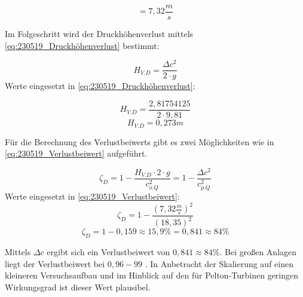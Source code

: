 $$ =7,32 \frac{m}{s}$$

Im Folgeschritt wird der Druckhöhenverlust mittels \autoref{eq:230519_Druckhöhenverlust} bestimmt:

\begin{equation}
H_{V.D} = \frac{\Delta c^2}{2\cdot g}
\label{eq:230519_Druckhöhenverlust}
\end{equation}
Werte eingesetzt in \autoref{eq:230519_Druckhöhenverlust}:

$$ H_{V.D} = \frac{2,81754125}{2\cdot 9,81} $$
$$ H_{V.D} = 0,273m $$

Für die Berechnung des Verlustbeiwerts gibt es zwei Möglichkeiten wie in \autoref{eq:230519_Verlustbeiwert} aufgeführt.

\begin{equation}
\zeta_D =1 - \frac{H_{V.D} \cdot 2 \cdot g}{c_{o.Q}^2}= 1 - \frac{\Delta c^2}{c_{p.Q}^2}
\label{eq:230519_Verlustbeiwert}
\end{equation}
Werte eingesetzt in \autoref{eq:230519_Verlustbeiwert}:
$$\zeta_{D} = 1 - \frac{(7,32\frac{m}{s})^2}{(18,35)^2}$$
$$ \zeta_{D} = 1 - 0,159 \approx 15,9\% = 0,841 \approx 84\% $$

Mittels $\Delta c$ ergibt sich ein Verlustbeiwert von $0,841 \approx 84\%$.
Bei großen Anlagen liegt der Verlustbeiwert bei $0,96-99$ \cite[S.32]{TUMUC}. 
In Anbetracht der Skalierung auf einen kleineren Versuchsaufbau und im Hinblick auf den für Pelton-Turbinen geringen Wirkungsgrad ist dieser Wert plausibel.